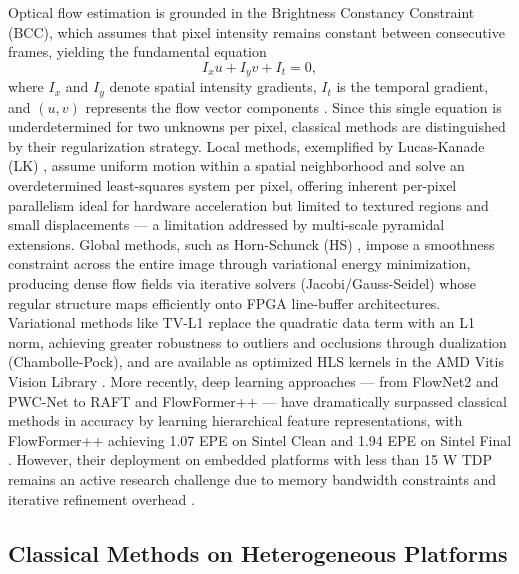 \documentclass[conference]{IEEEtran}
\begin{document}
Optical flow estimation is grounded in the Brightness Constancy Constraint (BCC), which assumes that pixel intensity remains constant between consecutive frames, yielding the fundamental equation
\begin{equation}
I_xu + I_yv + I_t = 0,
\end{equation}
where $I_x$ and $I_y$ denote spatial intensity gradients, $I_t$ is the temporal gradient, and $(u,v)$ represents the flow vector components \cite{ref4}. Since this single equation is underdetermined for two unknowns per pixel, classical methods are distinguished by their regularization strategy. Local methods, exemplified by Lucas-Kanade (LK) \cite{ref40}, assume uniform motion within a spatial neighborhood and solve an overdetermined least-squares system per pixel, offering inherent per-pixel parallelism ideal for hardware acceleration but limited to textured regions and small displacements --- a limitation addressed by multi-scale pyramidal extensions. Global methods, such as Horn-Schunck (HS) \cite{ref1}, impose a smoothness constraint across the entire image through variational energy minimization, producing dense flow fields via iterative solvers (Jacobi/Gauss-Seidel) whose regular structure maps efficiently onto FPGA line-buffer architectures. Variational methods like TV-L1 \cite{ref17} replace the quadratic data term with an L1 norm, achieving greater robustness to outliers and occlusions through dualization (Chambolle-Pock), and are available as optimized HLS kernels in the AMD Vitis Vision Library \cite{ref6,ref17}. More recently, deep learning approaches --- from FlowNet2 \cite{ref2} and PWC-Net \cite{ref8} to RAFT \cite{ref7} and FlowFormer++ \cite{ref10} --- have dramatically surpassed classical methods in accuracy by learning hierarchical feature representations, with FlowFormer++ achieving 1.07 EPE on Sintel Clean and 1.94 EPE on Sintel Final \cite{ref10}. However, their deployment on embedded platforms with less than 15 W TDP remains an active research challenge due to memory bandwidth constraints and iterative refinement overhead \cite{ref3,ref11}.

\subsection{Classical Methods on Heterogeneous Platforms}
\end{document}
